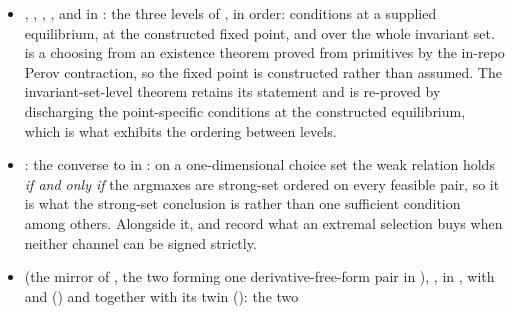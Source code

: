 \begin{itemize}[leftmargin=1.4em,itemsep=1pt]
the composite continuation is non-decreasing, where $\Delta$ is the sanction gap:
one lag, against every lag for the all-chord form.  A continuation term periodic
with period $\Delta$ therefore satisfies it with vanishing difference while being
far from convex, and the witness is the $1/2$-periodic
$\varphi(s)=\bigl|\,|s-1/2|-1/4\bigr|$ against a clamped sender response whose gap
at $a_L=0$, $a_H=1$ is exactly $1/2$.
\item {}, ,
, ,
 and
 in
: the three
levels of , in order: conditions at a supplied
equilibrium, at the constructed fixed point, and over the whole invariant set.
 is a  choosing from an existence
theorem proved from primitives by the in-repo Perov contraction, so the fixed
point is constructed rather than assumed.  The invariant-set-level theorem retains its
statement and is re-proved by discharging the point-specific conditions at the
constructed equilibrium, which is what exhibits the ordering between levels.
\item {}: the converse to
 in
: on a
one-dimensional choice set the weak relation holds \emph{if and only if} the
argmaxes are strong-set ordered on every feasible pair, so it is what the
strong-set conclusion is rather than one sufficient condition among others.
Alongside it,  and
 record what an extremal
selection buys when neither channel can be signed strictly.
\item {} (the mirror of , the two
forming one derivative-free-form pair in ),
,
 in
, with
 and
() and
 together with its
 twin
(): the two

\end{itemize}
